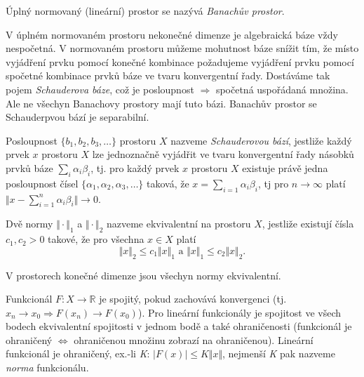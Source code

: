 \begin{definition}
Úplný normovaný (lineární) prostor se nazývá \textit{Banachův prostor}. 
\end{definition}

\begin{notes}

	V úplném normovaném prostoru nekonečné dimenze je algebraická báze vždy nespočetná. V normovaném prostoru můžeme mohutnost báze snížit tím, že místo vyjádření prvku pomocí konečné kombinace požadujeme vyjádření prvku pomocí spočetné kombinace prvků báze ve tvaru konvergentní řady. Dostáváme tak pojem \textit{Schauderova báze}, což je posloupnost $\Rightarrow$  spočetná uspořádaná množina. Ale ne všechyn Banachovy prostory mají tuto bázi. Banachův prostor se Schauderpvou bází je separabilní. 
\end{notes}

\begin{definition}
Posloupnost $\{b_1,b_2,b_3,\ldots \}$ prostoru $X$ nazveme \textit{Schauderovou bází}, jestliže každý prvek $x$ prostoru $X$ lze jednoznačně vyjádřit ve tvaru konvergentní řady násobků prvků báze $\sum_i \alpha_i\beta_i$, tj.  pro každý prvek $x$ prostoru $X$ existuje právě jedna posloupnost čísel $\{\alpha_1,\alpha_2,\alpha_3,\ldots\}$ taková, že $x=\sum_{i=1} \alpha_i\beta_i$, tj pro $n\rightarrow \infty$ platí $\Vert x-\sum_{i=1}^n  \alpha_i\beta_i \Vert \rightarrow 0.$	
\end{definition}
\begin{definition} 
Dvě normy $\Vert \cdot \Vert_1 $ a $\Vert \cdot \Vert_2$ nazveme ekvivalentní na prostoru $X$, jestliže existují čísla $c_1,c_2>0 $ takové, že pro všechna $x\in X$ platí \begin{equation*}
	\Vert x \Vert_2 \leq c_1 \Vert x\Vert_1 \text{    a    } \Vert x \Vert_1 \leq c_2 \Vert x\Vert_2.
\end{equation*}
	
\begin{theorem}
	V prostorech konečné dimenze jsou všechyn normy ekvivalentní.
\end{theorem}

\end{definition}
\begin{definition}
Funkcionál $F : X \rightarrow \mathbb{R}$ je spojitý, pokud zachovává konvergenci (tj. $x_n \rightarrow x_0 \Rightarrow F(x_n) \rightarrow F(x_0)$). Pro lineární funkcionály je spojitost ve všech bodech ekvivalentní spojitosti v jednom bodě a také ohraničenosti (funkcionál je ohraničený $ \Leftrightarrow $ ohraničenou množinu zobrazí na ohraničenou). Lineární funkcionál je ohraničený, ex.-li \textit{K}: $ \vert F(x) \vert \leq K \Vert x \Vert$, nejmenší \textit{K} pak nazveme \textit{norma} funkcionálu.
\end{definition}

